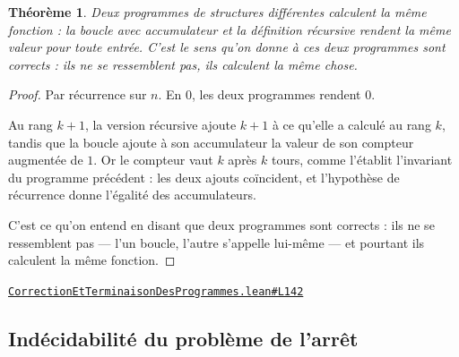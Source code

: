 \documentclass[11pt,a4paper]{article}
\theoremstyle{definition}
\theoremstyle{plain}
\newtheorem{theoreme}{Théorème}
\newcommand{\source}[2]{\par\smallskip\noindent\hfill{\footnotesize\href{#1}{\texttt{#2}}}\par\smallskip}
\begin{document}
\begin{theoreme}
Deux programmes de structures différentes calculent la même fonction : la boucle
avec accumulateur et la définition récursive rendent la même valeur pour toute
entrée. C'est le sens qu'on donne à \og{} ces deux programmes sont corrects \fg{} : ils ne
se ressemblent pas, ils calculent la même chose.
\end{theoreme}
\begin{proof}
Par récurrence sur \(n\). En \(0\), les deux programmes rendent \(0\).

Au rang \(k+1\), la version récursive ajoute \(k+1\) à ce qu'elle a calculé au rang
\(k\), tandis que la boucle ajoute à son accumulateur la valeur de son compteur
augmentée de \(1\). Or le compteur vaut \(k\) après \(k\) tours, comme l'établit
l'invariant du programme précédent : les deux ajouts coïncident, et l'hypothèse de
récurrence donne l'égalité des accumulateurs.

C'est ce qu'on entend en disant que deux programmes sont corrects : ils ne se
ressemblent pas — l'un boucle, l'autre s'appelle lui-même — et pourtant ils calculent
la même fonction.
\end{proof}
\source{https://github.com/Commutator-IO/learn-lean/blob/main/courses/02-lycee/11-informatique-nsi/CorrectionEtTerminaisonDesProgrammes.lean\#L142}{CorrectionEtTerminaisonDesProgrammes.lean\#L142}

\subsection{Indécidabilité du problème de l'arrêt}
\end{document}
